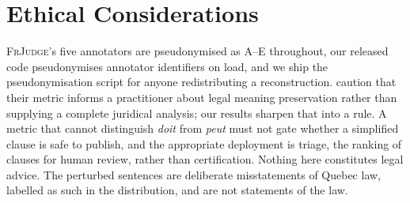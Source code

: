 \documentclass[11pt]{article}
\begin{document}
\section*{Ethical Considerations}
\label{sec:ethics}

\textsc{FrJudge}'s five annotators are pseudonymised as A--E throughout, our
released code pseudonymises annotator identifiers on load, and we ship the
pseudonymisation script for anyone redistributing a reconstruction.
\citet{beauchemin2025judgebert} caution that their metric informs a practitioner
about legal meaning preservation rather than supplying a complete juridical
analysis; our results sharpen that into a rule. A metric that cannot distinguish
\emph{doit} from \emph{peut} must not gate whether a simplified clause is safe
to publish, and the appropriate deployment is triage, the ranking of clauses for
human review, rather than certification. Nothing here constitutes legal advice.
The perturbed sentences are deliberate misstatements of Quebec law, labelled as
such in the distribution, and are not statements of the law.

\newpage

\end{document}
